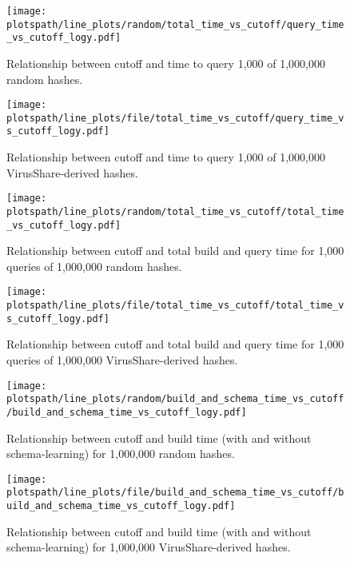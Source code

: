 \documentclass[5p,final]{elsarticle}
\newcommand{\plotspath}{paper-dependencies/latex-dependencies/plots}
\begin{document}
\clearpage

\begin{figure*}
	\centering

	\begin{subfigure}[b]{0.97\columnwidth}
		\centering
		\texttt{[image: \\plotspath/line\_plots/random/total\_time\_vs\_cutoff/query\_time\_vs\_cutoff\_logy.pdf]}
		\caption{Relationship between cutoff and
			time to query 1,000 of
		1,000,000 random hashes.}
		\label{fig:random_cutoff_vs_query_time}
	\end{subfigure}
	\hfill
	\begin{subfigure}[b]{0.97\columnwidth}
		\centering
		\texttt{[image: \\plotspath/line\_plots/file/total\_time\_vs\_cutoff/query\_time\_vs\_cutoff\_logy.pdf]}
		\caption{Relationship between cutoff and
			time to query 1,000 of
		1,000,000 VirusShare-derived hashes.}
		\label{fig:file_cutoff_vs_query_time}
	\end{subfigure}
	\hfill

	\vspace{1em}

	\begin{subfigure}[b]{0.97\columnwidth}
		\centering
		\texttt{[image: \\plotspath/line\_plots/random/total\_time\_vs\_cutoff/total\_time\_vs\_cutoff\_logy.pdf]}
		\caption{Relationship between cutoff and
			total build and query time
		for 1,000 queries of 1,000,000 random hashes.}
		\label{fig:random_cutoff_vs_total_time}
	\end{subfigure}
	\hfill
	\begin{subfigure}[b]{0.97\columnwidth}
		\centering
		\texttt{[image: \\plotspath/line\_plots/file/total\_time\_vs\_cutoff/total\_time\_vs\_cutoff\_logy.pdf]}
		\caption{Relationship between cutoff and
			total build and query time
		for 1,000 queries of 1,000,000 VirusShare-derived hashes.}
		\label{fig:file_cutoff_vs_total_time}
	\end{subfigure}

	\vspace{1em}

	\begin{subfigure}[b]{0.97\columnwidth}
		\centering
		\texttt{[image: \\plotspath/line\_plots/random/build\_and\_schema\_time\_vs\_cutoff/build\_and\_schema\_time\_vs\_cutoff\_logy.pdf]}
		\caption{Relationship between cutoff and
		build time (with and without schema-learning) for 1,000,000 random hashes.}
		\label{fig:random_cutoff_vs_build_time}
	\end{subfigure}
	\hfill
	\begin{subfigure}[b]{0.97\columnwidth}
		\centering
		\texttt{[image: \\plotspath/line\_plots/file/build\_and\_schema\_time\_vs\_cutoff/build\_and\_schema\_time\_vs\_cutoff\_logy.pdf]}
		\caption{Relationship between cutoff and
			build time (with and without schema-learning) for 1,000,000
		VirusShare-derived hashes.}
		\label{fig:file_cutoff_vs_build_time}
	\end{subfigure}


\end{figure*}
\end{document}
